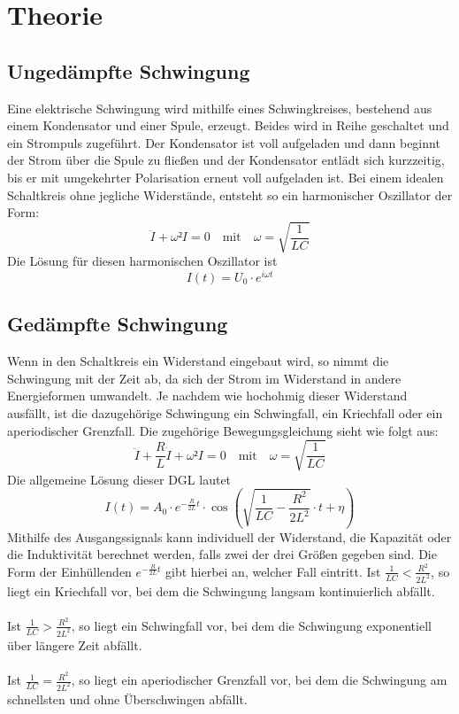 \section{Theorie}
\label{sec:Theorie}

\subsection{Ungedämpfte Schwingung}
Eine elektrische Schwingung wird mithilfe eines Schwingkreises, bestehend aus einem Kondensator und einer Spule, erzeugt.
Beides wird in Reihe geschaltet und ein Strompuls zugeführt.
Der Kondensator ist voll aufgeladen und dann beginnt der Strom über die Spule zu fließen und der Kondensator entlädt sich kurzzeitig, bis er mit umgekehrter Polarisation erneut voll aufgeladen ist.
Bei einem idealen Schaltkreis ohne jegliche Widerstände, entsteht so ein harmonischer Oszillator der Form:
\begin{equation}
    \ddot{I} + \omega² I = 0 \quad\textrm{mit}\quad \omega = \sqrt{\frac{1}{LC}}
    \label{eq:harmossi}
\end{equation}
Die Lösung für diesen harmonischen Oszillator ist
\begin{equation}
    I(t) = U_0\cdot e^{i\omega t}
\end{equation}
\subsection{Gedämpfte Schwingung}
Wenn in den Schaltkreis ein Widerstand eingebaut wird, so nimmt die Schwingung mit der Zeit ab, da sich der Strom im Widerstand in andere Energieformen umwandelt.
Je nachdem wie hochohmig dieser Widerstand ausfällt, ist die dazugehörige Schwingung ein Schwingfall, ein Kriechfall oder ein aperiodischer Grenzfall.
Die zugehörige Bewegungsgleichung sieht wie folgt aus:
\begin{equation}
    \ddot{I} + \frac{R}{L}\dot{I} + \omega² I = 0 \quad\textrm{mit}\quad \omega = \sqrt{\frac{1}{LC}}
    \label{eq:dampfossi}
\end{equation}
Die allgemeine Lösung dieser DGL lautet
\begin{equation}
    I(t) = A_0 \cdot e^{-\frac{R}{2L}t} \cdot \cos{(\sqrt{\frac{1}{LC}-\frac{R^2}{2L^2}}\cdot t+\eta)}
\end{equation}
Mithilfe des Ausgangssignals kann individuell der Widerstand, die Kapazität oder die Induktivität berechnet werden, falls zwei der drei Größen gegeben sind.
Die Form der Einhüllenden \(e^{-\frac{R}{2L}t}\) gibt hierbei an, welcher Fall eintritt.
Ist \(\frac{1}{LC}<\frac{R^2}{2L^2}\), so liegt ein Kriechfall vor, bei dem die Schwingung langsam kontinuierlich abfällt.
\\\\
Ist \(\frac{1}{LC}>\frac{R^2}{2L^2}\), so liegt ein Schwingfall vor, bei dem die Schwingung exponentiell über längere Zeit abfällt.
\\\\
Ist \(\frac{1}{LC}=\frac{R^2}{2L^2}\), so liegt ein aperiodischer Grenzfall vor, bei dem die Schwingung am schnellsten und ohne Überschwingen abfällt.
\\

